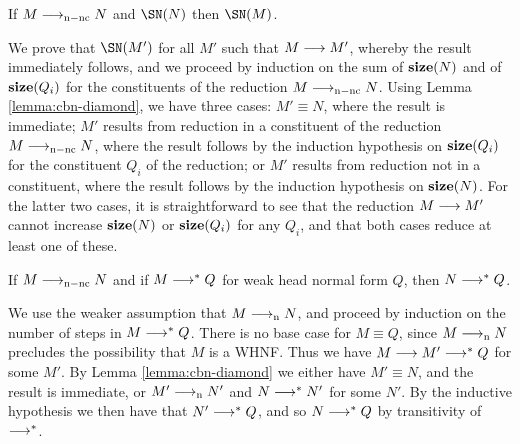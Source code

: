\documentclass{article}
\begin{document}
\begin{lemma}
  \label{lemma:cbn-nc-sn}
  If $M\longrightarrow_{\mathrm{n-nc}} N$ and $\SN(N)$ then $\SN(M)$.
\end{lemma}

\iftechreport
\begin{myproof}
  We prove that $\SN(M')$ for all $M'$ such that $M\longrightarrow M'$, whereby
  the result immediately follows, and we proceed by induction on the
  sum of $\mathbf{size}(N)$ and of $\mathbf{size}(Q_i)$ for the constituents of the
  reduction $M\longrightarrow_{\mathrm{n-nc}} N$. Using Lemma \ref{lemma:cbn-diamond}, we
  have three cases: $M'\equiv N$, where the result is immediate; $M'$
  results from reduction in a constituent of the reduction
  $M\longrightarrow_{\mathrm{n-nc}} N$, where the result follows by the induction
  hypothesis on $\mathbf{size}(Q_i)$ for the constituent $Q_i$ of the
  reduction; or $M'$ results from reduction not in a constituent,
  where the result follows by the induction hypothesis on $\mathbf{size}(N)$.
  For the latter two cases, it is straightforward to see that the
  reduction $M\longrightarrow M'$ cannot increase $\mathbf{size}(N)$ or $\mathbf{size}(Q_i)$
  for any $Q_i$, and that both cases reduce at least one of these.
\end{myproof}
\fi


\begin{lemma}
  \label{lemma:cbn-nc-whnf}
  If $M\longrightarrow_{\mathrm{n-nc}} N$ and if $M\longrightarrow^{*} Q$ for weak head normal form
  $Q$, then $N\longrightarrow^{*} Q$.
\end{lemma}

\iftechreport
\begin{myproof}
  We use the weaker assumption that $M\longrightarrow_{\mathrm{n}} N$, and proceed by
  induction on the number of steps in $M\longrightarrow^{*} Q$. There is no base
  case for $M\equiv Q$, since $M\longrightarrow_{\mathrm{n}} N$ precludes the possibility
  that $M$ is a WHNF. Thus we have $M\longrightarrow M'\longrightarrow^{*} Q$ for some
  $M'$. By Lemma \ref{lemma:cbn-diamond} we either have $M'\equiv N$,
  and the result is immediate, or $M'\longrightarrow_{\mathrm{n}} N'$ and $N\longrightarrow^{*} N'$
  for some $N'$. By the inductive hypothesis we then have that
  $N'\longrightarrow^{*} Q$, and so $N\longrightarrow^{*} Q$ by transitivity of
  $\longrightarrow^{*}$.
\end{myproof}
\fi

\else
\fi



\end{document}
